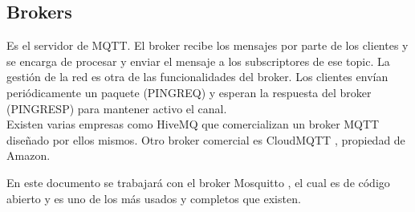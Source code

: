\documentclass[12pt, twoside]{book}
\begin{document}
\subsection*{Brokers}
Es el servidor de MQTT. El broker recibe los mensajes por parte de los clientes y se encarga de procesar y enviar el mensaje a los subscriptores de ese topic. La gestión de la red es otra de las funcionalidades del broker. Los clientes envían periódicamente un paquete (PINGREQ) y esperan la respuesta del broker (PINGRESP) para mantener activo el canal.\\
Existen varias empresas como HiveMQ \cite{hive}\cite{hive_doc} que comercializan un broker MQTT diseñado por ellos mismos. Otro broker comercial es CloudMQTT \cite{cloud_mqtt}, propiedad de Amazon.

En este documento se trabajará con el broker Mosquitto \cite{mosqtt}, el cual es de código abierto y es uno de los más usados y completos que existen.
\end{document}
